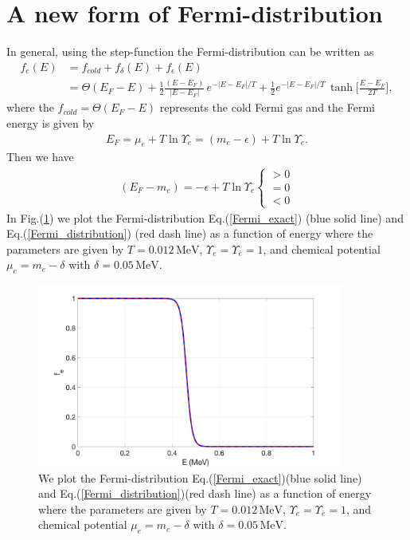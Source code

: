 \documentclass[onecolumn,preprintnumbers,amsmath,amssymb]{revtex4}
\begin{document}
\section{A new form of Fermi-distribution} 
In general, using the step-function the Fermi-distribution can be written as
\begin{align}
\label{Fermi_distribution}
f_e(E)&=f_{cold}+f_\delta(E)+f_\epsilon(E)\\
&=\Theta(E_F-E)+\frac{1}{2}\frac{(E-E_F)}{|E-E_F|}\,e^{-|E-E_F|/T}+\frac{1}{2}e^{-|E-E_F|/T}\,\tanh\bigg[\frac{E-E_F}{2T}\bigg],
\end{align}
where the $f_{cold}=\Theta(E_F-E)$ represents the cold Fermi gas and the Fermi energy is given by
\begin{align}
E_F=\mu_e+T\ln\Upsilon_e=\left(m_e-\epsilon\right)+T\ln\Upsilon_e.
\end{align}
Then we have
\begin{align}
\left(E_F-m_e\right)=-\epsilon+T\ln\Upsilon_e\left\{\begin{array}{c}>0 \\=0 \\<0\end{array}\right.
\end{align}
In Fig.(\ref{Fermi_Step}) we plot the Fermi-distribution Eq.(\ref{Fermi_exact}) (blue solid line) and Eq.(\ref{Fermi_distribution}) (red dash line) as a function of energy where the parameters are given by $T=0.012\,\mathrm{MeV}$, $\Upsilon_e=\Upsilon_{\bar e}=1$, and chemical potential $\mu_e=m_e-\delta$ with $\delta=0.05\,\mathrm{MeV}$.
\begin{figure}[h]
\begin{center}
\includegraphics[width=0.9\textwidth]{./plot/Fermi_step}
\caption{We plot the Fermi-distribution Eq.(\ref{Fermi_exact})(blue solid line) and Eq.(\ref{Fermi_distribution})(red dash line) as a function of energy where the parameters are given by $T=0.012\,\mathrm{MeV}$, $\Upsilon_e=\Upsilon_{\bar e}=1$, and chemical potential $\mu_e=m_e-\delta$ with $\delta=0.05\,\mathrm{MeV}$.}
\label{Fermi_Step}
\end{center}
\end{figure}
\end{document}
